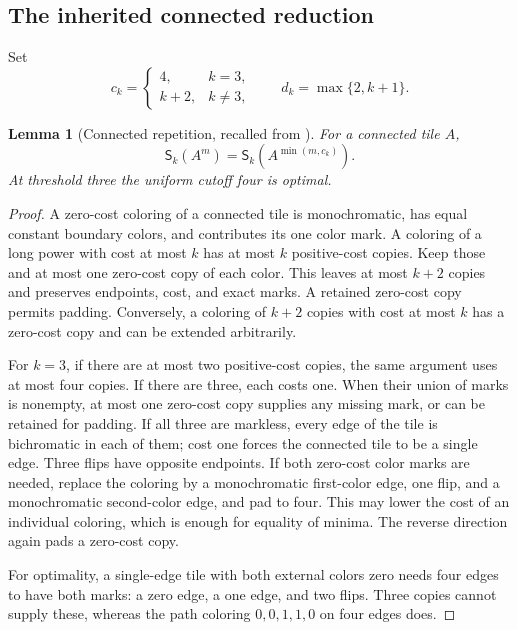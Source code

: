 \documentclass[11pt]{article}
\newtheorem{lemma}[theorem]{Lemma}
\theoremstyle{remark}\newtheorem{remark}[theorem]{Remark}
\newcommand{\Sig}{\mathsf S}
\begin{document}
\subsection{The inherited connected reduction}
Set
\begin{equation}\label{eq:cutoffs}
 c_k=\begin{cases}4,&k=3,\\k+2,&k\ne3,\end{cases}
 \qquad d_k=\max\{2,k+1\}.
\end{equation}
\begin{lemma}[Connected repetition, recalled from \cite{fourcopy}]\label{lem:connected}
For a connected tile $A$,
\[
 \Sig_k(A^m)=\Sig_k(A^{\min(m,c_k)}).
\]
At threshold three the uniform cutoff four is optimal.
\end{lemma}
\begin{proof}
A zero-cost coloring of a connected tile is monochromatic, has equal constant boundary colors, and contributes its one color mark. A coloring of a long power with cost at most $k$ has at most $k$ positive-cost copies. Keep those and at most one zero-cost copy of each color. This leaves at most $k+2$ copies and preserves endpoints, cost, and exact marks. A retained zero-cost copy permits padding. Conversely, a coloring of $k+2$ copies with cost at most $k$ has a zero-cost copy and can be extended arbitrarily.

For $k=3$, if there are at most two positive-cost copies, the same argument uses at most four copies. If there are three, each costs one. When their union of marks is nonempty, at most one zero-cost copy supplies any missing mark, or can be retained for padding. If all three are markless, every edge of the tile is bichromatic in each of them; cost one forces the connected tile to be a single edge. Three flips have opposite endpoints. If both zero-cost color marks are needed, replace the coloring by a monochromatic first-color edge, one flip, and a monochromatic second-color edge, and pad to four. This may lower the cost of an individual coloring, which is enough for equality of minima. The reverse direction again pads a zero-cost copy.

For optimality, a single-edge tile with both external colors zero needs four edges to have both marks: a zero edge, a one edge, and two flips. Three copies cannot supply these, whereas the path coloring $0,0,1,1,0$ on four edges does.
\end{proof}
\end{document}
